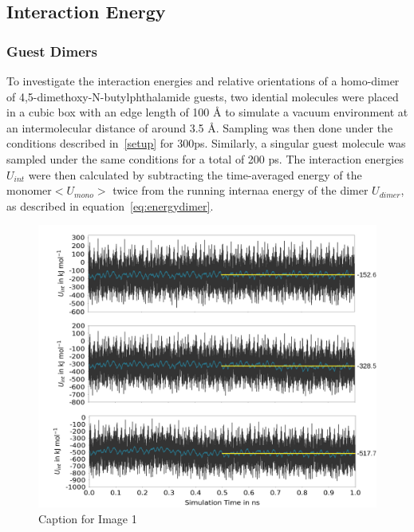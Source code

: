 \documentclass[11pt]{article}
\begin{document}
\subsection{Interaction Energy}
\subsubsection{Guest Dimers}
To investigate the interaction energies and relative orientations of a homo-dimer of 4,5-dimethoxy-N-butylphthalamide guests, two idential molecules were placed in a cubic box with an edge length of 100 Å to simulate a vacuum environment at an intermolecular distance of around 3.5 Å. Sampling was then done under the conditions described in~\ref{setup} for  300ps.  Similarly, a singular guest molecule was sampled under the same conditions for a total of 200 ps. The interaction energies $U_{int}$ were then calculated by subtracting the time-averaged energy of the monomer$<U_{mono}>$ twice from the running internaa energy of the dimer $U_{dimer}$, as described in equation~\ref{eq:energydimer}.



\begin{figure}[htbp]
  \centering
  \includegraphics[width=1\textwidth]{Images/3Energies.png}
  \caption{Caption for Image 1}
\end{figure}
\end{document}
